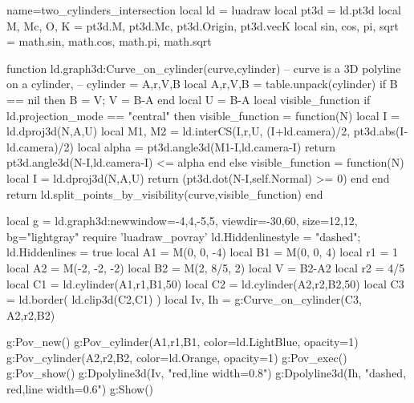 \documentclass{standalone}
\begin{document}
\begin{luadraw}{name=two_cylinders_intersection}
local ld = luadraw
local pt3d = ld.pt3d
local M, Mc, O, K = pt3d.M, pt3d.Mc, pt3d.Origin, pt3d.vecK
local sin, cos, pi, sqrt = math.sin, math.cos, math.pi, math.sqrt

function ld.graph3d:Curve_on_cylinder(curve,cylinder)
-- curve is a 3D polyline on a cylinder,
-- cylinder = {A,r,V,B}
    local A,r,V,B = table.unpack(cylinder)
    if B == nil then B = V; V = B-A end
    local U = B-A
    local visible_function
    if ld.projection_mode == "central" then
        visible_function = function(N)
            local I = ld.dproj3d(N,{A,U})
            local M1, M2 = ld.interCS({I,r,U},{ (I+ld.camera)/2, pt3d.abs(I-ld.camera)/2})
            local alpha = pt3d.angle3d(M1-I,ld.camera-I)
            return pt3d.angle3d(N-I,ld.camera-I) <= alpha
            end
    else
        visible_function = function(N)
            local I = ld.dproj3d(N,{A,U})
            return (pt3d.dot(N-I,self.Normal) >= 0)
            end
    end
    return ld.split_points_by_visibility(curve,visible_function)
end

local g = ld.graph3d:new{window={-4,4,-5,5}, viewdir={-30,60}, size={12,12}, bg="lightgray"}
require 'luadraw_povray'
ld.Hiddenlinestyle = "dashed"; ld.Hiddenlines = true
local A1 = M(0, 0, -4)
local B1 = M(0, 0, 4)
local r1 = 1
local A2 = M(-2, -2, -2)
local B2 = M(2, 8/5, 2)
local V = B2-A2
local r2 = 4/5
local C1 = ld.cylinder(A1,r1,B1,50)
local C2 = ld.cylinder(A2,r2,B2,50)
local C3 = ld.border( ld.clip3d(C2,C1) )
local Iv, Ih = g:Curve_on_cylinder(C3, {A2,r2,B2})

g:Pov_new()
g:Pov_cylinder(A1,r1,B1, {color=ld.LightBlue, opacity=1})
g:Pov_cylinder(A2,r2,B2, {color=ld.Orange, opacity=1})
g:Pov_exec()
g:Pov_show()
g:Dpolyline3d(Iv, "red,line width=0.8")
g:Dpolyline3d(Ih, "dashed, red,line width=0.6")
g:Show()
\end{luadraw}
\end{document}
